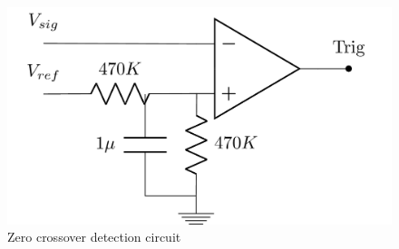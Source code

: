 \begin{figure} 
	\centering
	\includegraphics[width=0.55\linewidth]{tikz/triggerCircuit}
	\caption[Zero crossover detection circuit]{Zero crossover detection circuit}
	\label{fig:triggerCircuit}
	\vspace*{-3ex}
\end{figure}
